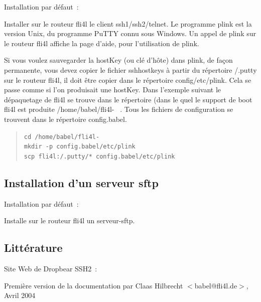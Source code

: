 \begin{description}


  Installation par défaut~: 

  Installer sur le routeur fli4l le client ssh1/ssh2/telnet. Le programme plink
  est la version Unix, du programme PuTTY connu sous Windows. Un appel de plink
  sur le routeur fli4l affiche la page d'aide, pour l'utilisation de plink.

  Si vous voulez sauvegarder la hostKey (ou clé d'hôte) dans plink, de façon
  permanente, vous devez copier le fichier sshhostkeys à partir du répertoire
  /.putty sur le routeur fli4l, il doit être copier dans le répertoire config/etc/plink.
  Cela se passe comme si l'on produisait une hostKey. Dans l'exemple suivant le
  dépaquetage de fli4l se trouve dans le répertoire (dans le quel le support de
  boot fli4l est produite /home/babel/fli4l-\version~ . Tous les fichiers de
  configuration se trouvent dans le répertoire config.babel.

\begin{example}
\begin{verse}
\texttt{cd /home/babel/fli4l-\version}\\
\texttt{mkdir -p config.babel/etc/plink}\\
\texttt{scp fli4l:/.putty/* config.babel/etc/plink}
\end{verse}
\end{example}

\end{description}

\subsection {Installation d'un serveur sftp}

\begin{description}


  Installation par défaut~: 

  Installe sur le routeur fli4l un serveur-sftp.

\end{description}

\subsection{Littérature}

Site Web de Dropbear SSH2~: 

Première version de la documentation par
Claas Hilbrecht $<$babel@fli4l.de$>$, Avril 2004
